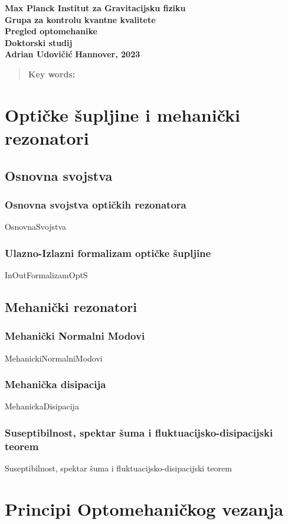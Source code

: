 \documentclass[10pt,leqno]{article}
\begin{document}
\begin{titlepage}
	\begin{center}
		{\large \textbf{Max Planck Institut za Gravitacijsku fiziku}} \\[0.1cm]
		{\large \textbf{Grupa za kontrolu kvantne kvalitete}}\\[0.1cm]
		{\large \textbf{Pregled optomehanike}} \\[0.1cm]
		{\large\textbf{Doktorski studij}}\\[2.5cm]
		\vspace{2cm}
		{\LARGE \textbf{Adrian Udovičić}}
		\vfill
		\large\textbf{{Hannover, 2023} }
	\end{center}
\end{titlepage}


\newpage
{}
\begin{abstract}
	\textbf{Key words:}
\end{abstract}
\newpage
\tableofcontents
\hrulefill
\newpage

\chapter{Optičke šupljine i mehanički rezonatori}
\section{Osnovna svojstva}
\subsection{Osnovna svojstva optičkih rezonatora}
{OsnovnaSvojstva}
\newpage
\subsection{Ulazno-Izlazni formalizam optičke šupljine}
{InOutFormalizamOptS}
\section{Mehanički rezonatori}
\subsection{Mehanički Normalni Modovi}
{MehanickiNormalniModovi}
\subsection{Mehanička disipacija}
{MehanickaDisipacija}
\subsection{Suseptibilnost, spektar šuma i fluktuacijsko-disipacijski teorem}
{Suseptibilnost, spektar šuma i fluktuacijsko-disipacijski teorem}

\newpage
\chapter{Principi Optomehaničkog vezanja}


\listoftables
\listoffigures
\end{document}
